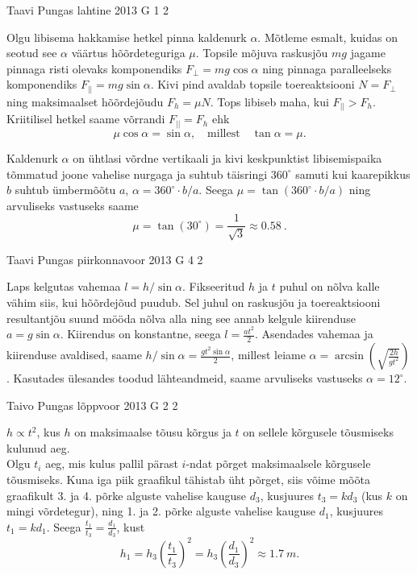 \documentclass[11pt, twoside]{article}
\begin{document}
{%
{Taavi Pungas} %
{lahtine} %
{2013} %
{G 1} %
{2} %
{

\ifSolution
Olgu libisema hakkamise hetkel pinna kaldenurk $\alpha$. Mõtleme esmalt, kuidas on seotud see $\alpha$ väärtus hõõrdeteguriga $\mu$. Topsile mõjuva raskusjõu $mg$ jagame pinnaga risti olevaks komponendiks $F_{\bot}=mg\cos\alpha$ ning pinnaga paralleelseks komponendiks $F_{||}=mg\sin\alpha$. Kivi pind avaldab topsile toereaktsiooni $N=F_\bot$ ning maksimaalset hõõrdejõudu $F_h=\mu N$. Tops libiseb maha, kui $F_{||}>F_h$. Kriitilisel hetkel saame võrrandi $F_{||}=F_h$ ehk
\[ \mu \cos \alpha = \sin\alpha, \quad \text{millest} \quad \tan\alpha = \mu.\]

Kaldenurk $\alpha$ on ühtlasi võrdne vertikaali ja kivi keskpunktist libisemispaika tõmmatud joone vahelise nurgaga ja suhtub täisringi $360^\circ$ samuti kui kaarepikkus $b$ suhtub ümbermõõtu $a$, $\alpha = 360^\circ \!\cdot\! b/a$. Seega $\mu = \tan (360^\circ \! \cdot\! b/a)$ ning arvuliseks vastuseks saame 
\[\mu = \tan (30^\circ) = \frac{1}{\sqrt{3}} \approx \SI{0,58}{}.\]
\fi
}

{Taavi Pungas} %
{piirkonnavoor} %
{2013} %
{G 4} %
{2} %
{

\ifSolution
Laps kelgutas vahemaa $l=h / \sin \alpha$. Fikseeritud $h$ ja $t$ puhul on nõlva kalle vähim siis, kui hõõrdejõud puudub. Sel juhul on raskusjõu ja toereaktsiooni resultantjõu suund mööda nõlva alla ning see annab kelgule kiirenduse $a=g \sin \alpha$. Kiirendus on konstantne, seega $l=\frac{a t^2}{2}$. Asendades vahemaa ja kiirenduse avaldised, saame $h / \sin \alpha = \frac{g t^2 \sin \alpha}{2}$, millest leiame $\alpha = \arcsin( \sqrt{\frac{2h}{g t^2}})$. Kasutades ülesandes toodud lähteandmeid, saame arvuliseks vastuseks $\alpha = 12^\circ$. 
\fi
}

{Taivo Pungas} %
{lõppvoor} %
{2013} %
{G 2} %
{2} %
{

\ifSolution
$h \propto t^{2}$, kus $h$ on maksimaalse tõusu kõrgus ja $t$ on sellele kõrgusele tõusmiseks kulunud aeg.\\
Olgu $t_{i}$ aeg, mis kulus pallil pärast $i$-ndat põrget maksimaalsele kõrgusele tõusmiseks. Kuna iga piik graafikul tähistab üht põrget, siis võime mõõta graafikult 3. ja 4. põrke alguste vahelise kauguse $d_{3}$, kusjuures $t_{3}=kd_{3}$ (kus $k$ on mingi võrdetegur), ning 1. ja 2. põrke alguste vahelise kauguse $d_{1}$, kusjuures $t_{1}=kd_{1}$. Seega 
$\frac{t_{1}}{t_{3}}=\frac{d_{1}}{d_{3}}$, kust
$$h_{1}=h_{3}(\frac{t_{1}}{t_{3}})^{2}=h_{3}(\frac{d_{1}}{d_{3}})^{2} \approx \SI{1,7}{m}.$$\\
\fi
}

}
\end{document}
